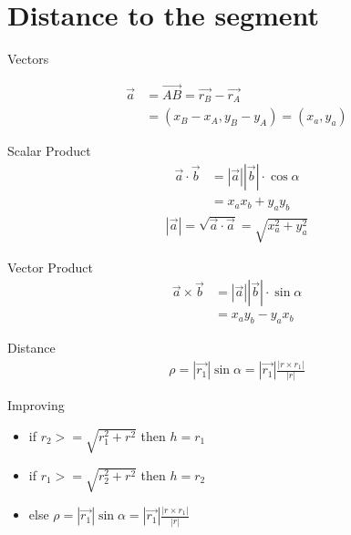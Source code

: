 \documentclass[10pt]{beamer}
\begin{document}
\section{Distance to the segment}

\begin{frame}{Vectors}

		
		\begin{align*}
				\overrightarrow{a} & = \overrightarrow{AB} = \overrightarrow{r_B} - \overrightarrow{r_A} \\
				 & = (x_B-x_A,y_B-y_A) = (x_a,y_a) 	
		\end{align*}


\end{frame}

\begin{frame}{Scalar Product}
		\begin{align*}
				\overrightarrow{a} \cdot \overrightarrow{b} & = |\overrightarrow{a}||\overrightarrow{b}|\cdot\cos\alpha \\
				& = x_a x_b + y_a y_b 
		\end{align*}
		\begin{align*}
				|\overrightarrow{a}| = \sqrt{\overrightarrow{a} \cdot \overrightarrow{a}} = \sqrt{x_a^2 + y_a^2}
		\end{align*}
\end{frame}

\begin{frame}{Vector Product}
		\begin{align*}
				\overrightarrow{a} \times \overrightarrow{b} & = |\overrightarrow{a}||\overrightarrow{b}|\cdot\sin\alpha \\
				& = x_a y_b  - y_a x_b  
		\end{align*}
\end{frame}

\begin{frame}{Distance}
		\begin{align*}
				\rho  = |\overrightarrow{r_1}|\sin\alpha = |\overrightarrow{r_1}|\frac{|r\times r_1|}{|r|}
		\end{align*}
\end{frame}
\begin{frame}{Improving}
		\begin{itemize}
			\item if $r_2 >= \sqrt{r_1^2 + r^2}$ then $h=r_1$
			\item if $r_1 >= \sqrt{r_2^2 + r^2}$ then $h=r_2$
			\item else $\rho  = |\overrightarrow{r_1}|\sin\alpha = |\overrightarrow{r_1}|\frac{|r\times r_1|}{|r|}$
	\end{itemize}
\end{frame}
\end{document}
